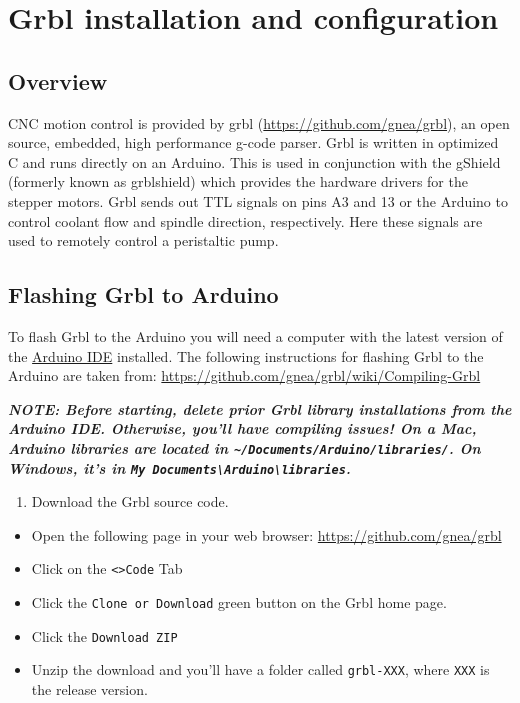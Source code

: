 \documentclass[]{book}
\providecommand{\tightlist}{%
  \setlength{\itemsep}{0pt}\setlength{\parskip}{0pt}}
\theoremstyle{definition}
\theoremstyle{definition}
\theoremstyle{remark}
\begin{document}
\chapter{Grbl installation and
configuration}\label{grbl-installation-and-configuration}

\section{Overview}\label{overview}

CNC motion control is provided by grbl
(\url{https://github.com/gnea/grbl}), an open source, embedded, high
performance g-code parser. Grbl is written in optimized C and runs
directly on an Arduino. This is used in conjunction with the gShield
(formerly known as grblshield) which provides the hardware drivers for
the stepper motors. Grbl sends out TTL signals on pins A3 and 13 or the
Arduino to control coolant flow and spindle direction, respectively.
Here these signals are used to remotely control a peristaltic pump.

\section{Flashing Grbl to Arduino}\label{flashing-grbl-to-arduino}

To flash Grbl to the Arduino you will need a computer with the latest
version of the \href{https://www.arduino.cc/en/Main/Software}{Arduino
IDE} installed. The following instructions for flashing Grbl to the
Arduino are taken from:
\url{https://github.com/gnea/grbl/wiki/Compiling-Grbl}

\emph{\textbf{NOTE: Before starting, delete prior Grbl library
installations from the Arduino IDE. Otherwise, you'll have compiling
issues! On a Mac, Arduino libraries are located in
\texttt{\textasciitilde{}/Documents/Arduino/libraries/}. On Windows,
it's in
\texttt{My\ Documents\textbackslash{}Arduino\textbackslash{}libraries}.}}

\begin{enumerate}
\def\labelenumi{\arabic{enumi}.}
\tightlist
\item
  Download the Grbl source code.
\end{enumerate}

\begin{itemize}
\tightlist
\item
  Open the following page in your web browser:
  \url{https://github.com/gnea/grbl}
\item
  Click on the \texttt{\textless{}\textgreater{}Code} Tab
\item
  Click the \texttt{Clone\ or\ Download} green button on the Grbl home
  page.
\item
  Click the \texttt{Download\ ZIP}
\item
  Unzip the download and you'll have a folder called \texttt{grbl-XXX},
  where \texttt{XXX} is the release version.
\end{itemize}
\end{document}
